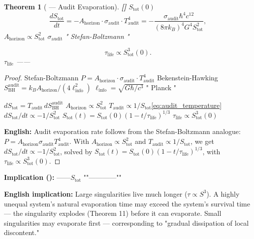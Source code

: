 \documentclass[12pt,a4paper]{article}
\newtheorem{theorem}{Theorem}[section]
\theoremstyle{remark}
\newcommand{\rigorFull}{\textnormal{\textbf{[]}}}
\newcommand{\cG}{G}          %
\newcommand{\cC}{c}          %
\newcommand{\cH}{\hbar}      %
\begin{document}
\begin{theorem}[ — Audit Evaporation]\label{thm:audit_evaporation}\rigorFull
 $S_{\mathrm{tot}}(0)$
\begin{equation}
    \frac{d S_{\mathrm{tot}}}{dt} = -A_{\mathrm{horizon}} \cdot \sigma_{\mathrm{audit}} \cdot T_{\mathrm{audit}}^4 = -\frac{\sigma_{\mathrm{audit}} \cH^4 \cC^{12}}{(8\pi k_B)^4 \cG^4 S_{\mathrm{tot}}^2},
    \label{eq:evaporation}
\end{equation}
 $A_{\mathrm{horizon}} \propto S_{\mathrm{tot}}^2$ $\sigma_{\mathrm{audit}}$ " Stefan-Boltzmann "


\begin{equation}
    \tau_{\mathrm{life}} \propto S_{\mathrm{tot}}^3(0).
\end{equation}
 $\tau_{\mathrm{life}}$ ——
\end{theorem}

\begin{proof}
 Stefan-Boltzmann $P = A_{\mathrm{horizon}} \cdot \sigma_{\mathrm{audit}} \cdot T_{\mathrm{audit}}^4$ Bekenstein-Hawking $S_{\mathrm{BH}}^{\mathrm{audit}} = k_B A_{\mathrm{horizon}}/(4\ell_{\mathrm{info}}^2)$ $\ell_{\mathrm{info}} = \sqrt{\cG\cH/\cC^3}$ " Planck "

 $dS_{\mathrm{tot}} = T_{\mathrm{audit}}\, dS_{\mathrm{BH}}^{\mathrm{audit}}$ $A_{\mathrm{horizon}} \propto S_{\mathrm{tot}}^2$ $T_{\mathrm{audit}} \propto 1/S_{\mathrm{tot}}$\ref{eq:audit_temperature} $dS_{\mathrm{tot}}/dt \propto -1/S_{\mathrm{tot}}^2$ $S_{\mathrm{tot}}(t) = S_{\mathrm{tot}}(0)(1 - t/\tau_{\mathrm{life}})^{1/3}$ $\tau_{\mathrm{life}} \propto S_{\mathrm{tot}}^3(0)$

\textbf{English:} Audit evaporation rate follows from the Stefan-Boltzmann analogue: $P = A_{\mathrm{horizon}}\sigma_{\mathrm{audit}}T_{\mathrm{audit}}^4$. With $A_{\mathrm{horizon}} \propto S_{\mathrm{tot}}^2$ and $T_{\mathrm{audit}} \propto 1/S_{\mathrm{tot}}$, we get $dS_{\mathrm{tot}}/dt \propto -1/S_{\mathrm{tot}}^2$, solved by $S_{\mathrm{tot}}(t) = S_{\mathrm{tot}}(0)(1-t/\tau_{\mathrm{life}})^{1/3}$, with $\tau_{\mathrm{life}} \propto S_{\mathrm{tot}}^3(0)$.
\end{proof}

\vspace{4pt}
\noindent
\textbf{Implication ():} ——$S_{\mathrm{tot}}$ ""————""

\vspace{4pt}
\noindent
\textbf{English implication:} Large singularities live much longer ($\tau \propto S^3$). A highly unequal system's natural evaporation time may exceed the system's survival time — the singularity explodes (Theorem 11) before it can evaporate. Small singularities may evaporate first — corresponding to "gradual dissipation of local discontent."
\end{document}
